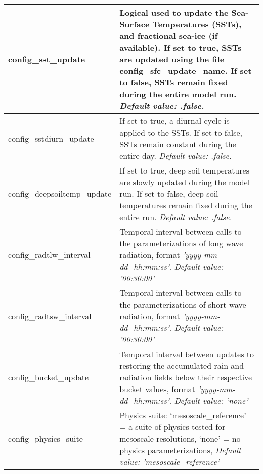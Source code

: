 {\small
\begin{longtable}{|p{2.0in} |p{4.25in}|}
 \hline

  config\_sst\_update & Logical used to update the Sea-Surface Temperatures (SSTs), and fractional sea-ice (if available). If set to true, SSTs are updated using the file config\_sfc\_update\_name. If set to false, SSTs remain fixed during the entire model run. \newline 
  {\em Default value: .false.} \\ \hline

  config\_sstdiurn\_update & If set to true, a diurnal cycle is applied to the SSTs. If set to false, SSTs remain constant during the entire day.\newline 
  {\em Default value: .false.} \\ \hline

  config\_deepsoiltemp\_update & If set to true, deep soil temperatures are slowly updated during the model run. If set to false, deep soil temperatures remain fixed during the entire run. \newline 
  {\em Default value: .false.} \\ \hline
  
  config\_radtlw\_interval & Temporal interval between calls to the parameterizations of long wave radiation, format {\em 'yyyy-mm-dd\_hh:mm:ss'}. \newline 
  {\em Default value: '00:30:00'} \\ \hline

  config\_radtsw\_interval & Temporal interval between calls to the parameterizations of short wave radiation, format {\em 'yyyy-mm-dd\_hh:mm:ss'}. \newline 
  {\em Default value: '00:30:00'} \\ \hline     

  config\_bucket\_update & Temporal interval between updates to restoring the accumulated rain and radiation fields below their respective bucket values, format {\em 'yyyy-mm-dd\_hh:mm:ss'}. \newline 
  {\em Default value: 'none'} \\ \hline      

  config\_physics\_suite & Physics suite: \newline
                                             `mesoscale\_reference' = a suite of physics tested for mesoscale resolutions, \newline
                                             `none' = no physics parameterizations, \newline
  {\em Default value: 'mesoscale\_reference'} \\ \hline


\end{longtable}}
